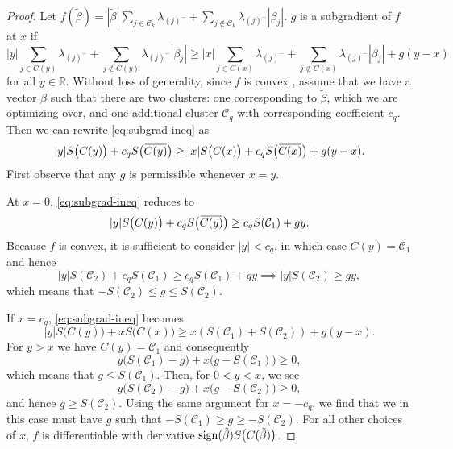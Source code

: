 \begin{proof}
  Let \(f(\tilde\beta) = |\tilde\beta|\sum_{j \in \mathcal{C}_k}\lambda_{(j)^-} + \sum_{j \notin \mathcal{C}_k} \lambda_{(j)^-}|\beta_j|\).
  \(g\)  is a subgradient of \(f\) at \(x\) if
  \begin{equation}
    \label{eq:subgrad-ineq}
    |y|\sum_{j \in C(y)}\lambda_{(j)^-} + \sum_{j \notin C(y)}\lambda_{(j)^-}|\beta_j|
    \geq |x|\sum_{j \in C(x)} \lambda_{(j)^-} + \sum_{j \notin C(x)}\lambda_{(j)^-}|\beta_j| + g(y - x)
  \end{equation}
  for all \(y \in \mathbb{R}\).
  Without loss of generality, since \(f\) is convex , assume that we have
  a vector \(\beta\) such that there are two clusters: one corresponding
  to \(\tilde\beta\), which we are optimizing over, and
  one additional cluster \(\mathcal{C}_q\) with corresponding
  coefficient \(c_q\).
  Then we can rewrite \eqref{eq:subgrad-ineq} as
  \[
    |y|S\big(C(y)\big) + c_q S\big(\widebar{C(y)}\big) \geq
    |x| S\big(C(x)\big) + c_q S\big(\widebar{C(x)}\big) + g(y - x).
  \]
  First observe that any \(g\) is permissible whenever \(x = y\).

  At \(x = 0\), \eqref{eq:subgrad-ineq} reduces to
  \[
    |y|S\big(C(y)\big) + c_q S\big(\widebar{C(y)}\big)
    \geq c_q S(\mathcal{C}_1) + gy.
  \]
  Because \(f\) is convex, it is sufficient to consider \(|y| < c_q\),
  in which case \(C(y) = \mathcal{C}_1\) and hence
  \begin{equation}
      |y|S(\mathcal{C}_2) + c_q S(\mathcal{C}_1) \geq c_q S(\mathcal{C}_1) + gy \implies
      |y|S(\mathcal{C}_2) \geq gy,
  \end{equation}
  which means that \(-S(\mathcal{C}_2) \leq g \leq S(\mathcal{C}_2)\).

  If \(x = c_q\), \eqref{eq:subgrad-ineq} becomes
  \[
    |y|S\big(C(y)\big) + x S\big(C(x)\big) \geq x(S(\mathcal{C}_1) + S(\mathcal{C}_2)) + g(y - x).
  \]
  For \(y > x\) we have \(C(y) = \mathcal{C}_1\) and consequently
  \[
    y\big(S(\mathcal{C}_1) - g\big) + x\big(g - S(\mathcal{C}_1)\big) \geq 0,
  \]
  which means that \(g \leq S(\mathcal{C}_1)\).
  Then, for \(0 < y < x\), we see
  \[
    y\big(S(\mathcal{C}_2) - g\big) + x(g - S(\mathcal{C}_2)\big) \geq 0,
  \]
  and hence \(g \geq S(\mathcal{C}_2)\).
  Using the same argument for \(x = -c_q\), we find that we in this case
  must have \(g\) such that
  \(-S(\mathcal{C}_1) \geq g \geq - S(\mathcal{C}_2)\).
  For all other choices of \(x\), \(f\) is differentiable with
  derivative \(\operatorname{sign}(\tilde\beta)S\big(C(\tilde\beta)\big)\).
\end{proof}

